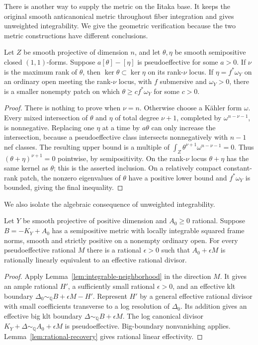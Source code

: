 There is another way to supply the metric on the Iitaka base.  It keeps
the original smooth anticanonical metric throughout fiber integration
and gives unweighted integrability.  We give the geometric verification
because the two metric constructions have different conclusions.

\begin{lemma}\label{conv:null-curvature}
Let $Z$ be smooth projective of dimension $n$, and let $\theta,\eta$ be
smooth semipositive closed $(1,1)$-forms.  Suppose $a[\theta]-[\eta]$
is pseudoeffective for some $a>0$.  If $\nu$ is the maximum rank of
$\theta$, then $\ker\theta\subset\ker\eta$ on its rank-$\nu$ locus.
If $\eta=f^*\omega_Y$ on an ordinary open meeting the rank-$\nu$
locus, with $f$ submersive and $\omega_Y>0$, there is a smaller
nonempty patch on which
$\theta\ge c f^*\omega_Y$ for some $c>0$.
\end{lemma}
\begin{proof}
There is nothing to prove when $\nu=n$.  Otherwise choose a K\"ahler
form $\omega$.  Every mixed intersection of $\theta$ and $\eta$ of
total degree $\nu+1$, completed by $\omega^{n-\nu-1}$, is
nonnegative.  Replacing one $\eta$ at a time by $a\theta$ can only
increase the intersection, because a pseudoeffective class intersects
nonnegatively with $n-1$ nef classes.  The resulting upper bound is a
multiple of $\int_Z\theta^{\nu+1}\omega^{n-\nu-1}=0$.
Thus $(\theta+\eta)^{\nu+1}=0$ pointwise, by semipositivity.  On the
rank-$\nu$ locus $\theta+\eta$ has the same kernel as $\theta$;
this is the asserted inclusion.  On a relatively compact constant-rank
patch, the nonzero eigenvalues of $\theta$ have a positive lower bound
and $f^*\omega_Y$ is bounded, giving the final inequality.
\end{proof}

We also isolate the algebraic consequence of unweighted integrability.

\begin{corollary}\label{conv:unweighted-effectivity}
Let $Y$ be smooth projective of positive dimension and $A_0\ge0$
rational.  Suppose $B=-K_Y+A_0$ has a semipositive metric with locally
integrable squared frame norms, smooth and strictly positive on a
nonempty ordinary open.  For every pseudoeffective rational $M$ there
is a rational $\epsilon>0$ such that
$A_0+\epsilon M$ is rationally linearly equivalent to an effective
rational divisor.
\end{corollary}
\begin{proof}
Apply Lemma~\ref{lem:integrable-neighborhood} in the direction $M$.
It gives an ample rational $H'$, a sufficiently small rational
$\epsilon>0$, and an effective klt boundary
$\Delta_0\sim_{\mathbb Q}B+\epsilon M-H'$.
Represent $H'$ by a general effective rational divisor with small
coefficients transverse to a log resolution of $\Delta_0$.
Its addition gives an effective big klt boundary
$\Delta\sim_{\mathbb Q}B+\epsilon M$.  The log canonical divisor
$K_Y+\Delta\sim_{\mathbb Q}A_0+\epsilon M$ is pseudoeffective.
Big-boundary nonvanishing \cite[Theorem~D]{BCHM2010} applies.
Lemma~\ref{lem:rational-recovery} gives rational linear effectivity.
\end{proof}

